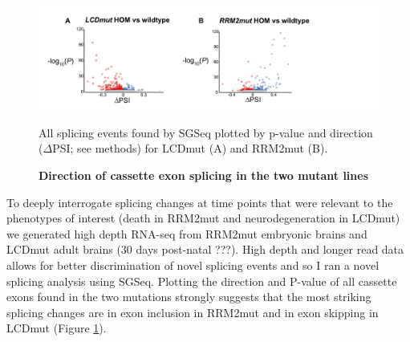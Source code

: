 \begin{figure}[h!]
	\centering
	\includegraphics[width=15cm]{Figures/05_tdp_mice/transcriptome_scatters.png}
	\caption{\textbf{Direction of cassette exon splicing in the two mutant lines}}
	All splicing events found by SGSeq plotted by p-value and direction ($\Delta$PSI; see methods) for LCDmut (A) and RRM2mut (B).
	\label{fig:cassette_scatters}
\end{figure}

To deeply interrogate splicing changes at time points that were relevant to the phenotypes of interest (death in RRM2mut and neurodegeneration in LCDmut) we generated high depth RNA-seq from RRM2mut embryonic brains and LCDmut adult brains (30 days post-natal ???). High depth and longer read data allows for better discrimination of novel splicing events and so I ran a novel splicing analysis using SGSeq. Plotting the direction and P-value of all cassette exons found in the two mutations strongly suggests that the most striking splicing changes are in exon inclusion in RRM2mut and in exon skipping in LCDmut (Figure \ref{fig:cassette_scatters}).


